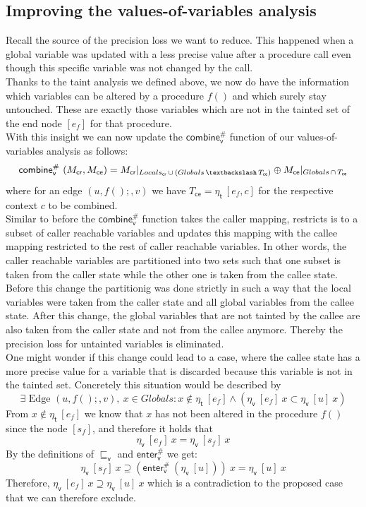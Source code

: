     \subsection{Improving the values-of-variables analysis}
    Recall the source of the precision loss we want to reduce. This happened when a global variable was updated with a less precise value after a procedure call even though this specific variable was not changed by the call.\\
    Thanks to the taint analysis we defined above, we now do have the information which variables can be altered by a procedure $f()$ and which surely stay untouched. These are exactly those variables which are not in the tainted set of the end node $[e_f]$ for that procedure.\\
    With this insight we can now update the $\textsf{combine}^{\#}_\textsf{v}$ function of our values-of-variables analysis as follows:
    \[
      \textsf{combine}^{\#}_\textsf{v}\ (M_\textsf{cr}, M_\textsf{ce}) = M_\textsf{cr}|_{Locals_\textsf{cr}\, \cup\, (Globals\, \textbackslash\, T_\textsf{ce})} \oplus M_\textsf{ce}|_{Globals\, \cap\, T_\textsf{ce}}
    \]
    where for an edge $(u, f();, v)$ we have $T_\textsf{ce} = \eta_\textsf{t}\ [e_f, c]$ for the respective context $c$ to be combined.\\
    Similar to before the $\textsf{combine}^{\#}_\textsf{v}$ function takes the caller mapping, restricts is to a subset of caller reachable variables and updates this mapping with the callee mapping restricted to the rest of caller reachable variables. In other words, the caller reachable variables are partitioned into two sets such that one subset is taken from the caller state while the other one is taken from the callee state. Before this change the partitionig was done strictly in such a way that the local variables were taken from the caller state and all global variables from the callee state. After this change, the global variables that are not tainted by the callee are also taken from the caller state and not from the callee anymore. Thereby the precision loss for untainted variables is eliminated.
    \\
    One might wonder if this change could lead to a case, where the callee state has a more precise value for a variable that is discarded because this variable is not in the tainted set. Concretely this situation would be described by 
    \[\exists \text{ Edge }(u, f();, v),\ x \in Globals: x \notin \eta_\textsf{t}\ [e_f] \land (\eta_\textsf{v}\ [e_f]\ x\subset \eta_\textsf{v}\ [u]\ x)\]
    From $x \notin \eta_\textsf{t}\ [e_f]$ we know that $x$ has not been altered in the procedure $f()$ since the node $[s_f]$, and therefore it holds that 
    \[\eta_\textsf{v}\ [e_f]\ x = \eta_\textsf{v}\ [s_f]\ x\]
    By the definitions of $\sqsubseteq_\textsf{v}$ and $\textsf{enter}^{\#}_\textsf{v}$ we get: 
    \[\eta_\textsf{v}\ [s_f]\ x \supseteq (\textsf{enter}^{\#}_\textsf{v}\ (\eta_\textsf{v}\ [u]))\ x = \eta_\textsf{v}\ [u]\ x\]
    Therefore, $\eta_\textsf{v}\ [e_f]\ x\supseteq \eta_\textsf{v}\ [u]\ x$ which is a contradiction to the proposed case that we can therefore exclude.

